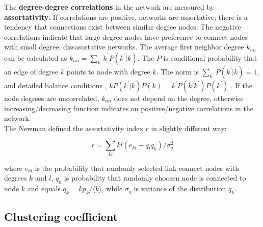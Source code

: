 The \textbf{degree-degree correlations} in the network are measured by \textbf{assortativity}. If correlations are positive, networks are assortative; there is a tendency that connections exist between similar degree nodes. The negative correlations indicate that large degree nodes have preference to connect nodes with small degree; dissasortative networks. The average first neighbor degree $k_{nn}$ can be calculated as $k_{nn} = \sum_{k^{'}}k^{'}P(k^{'}|{k})$. The $P$ is conditional probability that an edge of degree $k$ points to node with degree $k$. The norm is $\sum_{k^{'}}P(k^{'}|k)=1$, and detailed balance conditions \cite{boccaletti2006},  $kP(k^{'}|k)P(k) = k^{'}P(k|k^{'})P(k^{'})$ \cite{boccaletti2006}. If the node degrees are uncorrelated, $k_{nn}$ does not depend on the degree, otherwise increasing/decreasing function indicates on positive/negative correlations in the network. \\

The Newman defined the assortativity index $r$ in slightly different way:

\begin{equation}
r = \sum_{kl}kl(e_{kl} - q_lq_k) / \sigma_q^2
\end{equation}

where $e_{kl}$ is the probability that randomly selected link connect nodes with degrees $k$ and $l$, $q_k$ is probability that randomly choosen node is connected to node $k$ and equals $q_k = kp_k / \langle k \rangle$, while $\sigma_q$ is variance of the distribution $q_k$. 

\subsection{Clustering coefficient}




